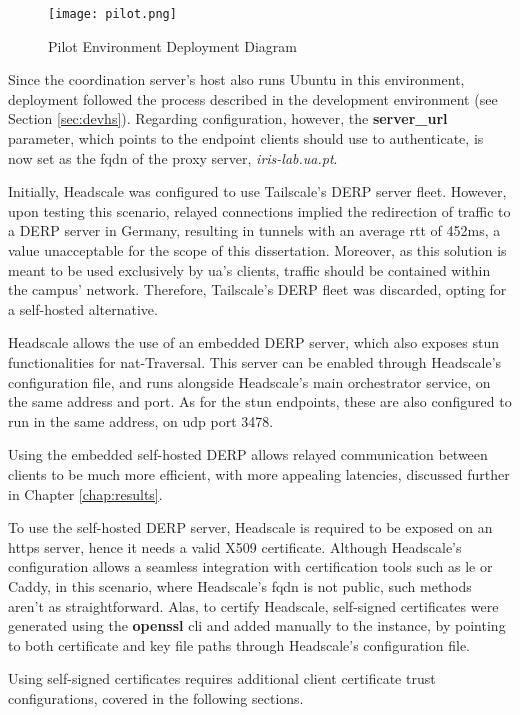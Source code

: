 \documentclass[11pt,twoside,a4paper]{report}
\begin{document}
\begin{figure}[h]
\centering
\texttt{[image: pilot.png]}
\caption{Pilot Environment Deployment Diagram}
\label{fig:prodsolution}
\end{figure}

Since the coordination server's host also runs Ubuntu in this environment, deployment followed the process described in the development environment (see Section \ref{sec:devhs}). Regarding configuration, however, the \textbf{server\_url} parameter, which points to the endpoint clients should use to authenticate, is now set as the \ac{fqdn} of the proxy server, \emph{iris-lab.ua.pt}.

Initially, Headscale was configured to use Tailscale's \ac{DERP} server fleet. However, upon testing this scenario, relayed connections implied the redirection of traffic to a \ac{DERP} server in Germany, resulting in tunnels with an average \ac{rtt} of 452ms, a value unacceptable for the scope of this dissertation. Moreover, as this solution is meant to be used exclusively by \ac{ua}'s clients, traffic should be contained within the campus' network. Therefore, Tailscale's \ac{DERP} fleet was discarded, opting for a self-hosted alternative.

Headscale allows the use of an embedded \ac{DERP} server, which also exposes \ac{stun} functionalities for \ac{nat}-Traversal. This server can be enabled through Headscale's configuration file, and runs alongside Headscale's main orchestrator service, on the same address and port. As for the \ac{stun} endpoints, these are also configured to run in the same address, on \ac{udp} port 3478.

Using the embedded self-hosted \ac{DERP} allows relayed communication between clients to be much more efficient, with more appealing latencies, discussed further in Chapter \ref{chap:results}.

To use the self-hosted \ac{DERP} server, Headscale is required to be exposed on an \ac{https} server, hence it needs a valid X509 certificate. Although Headscale's configuration allows a seamless integration with certification tools such as \ac{le} or Caddy, in this scenario, where Headscale's \ac{fqdn} is not public, such methods aren't as straightforward. Alas, to certify Headscale, self-signed certificates were generated using the \textbf{openssl} \ac{cli} and added manually to the instance, by pointing to both certificate and key file paths through Headscale's configuration file.

Using self-signed certificates requires additional client certificate trust configurations, covered in the following sections.
\end{document}
